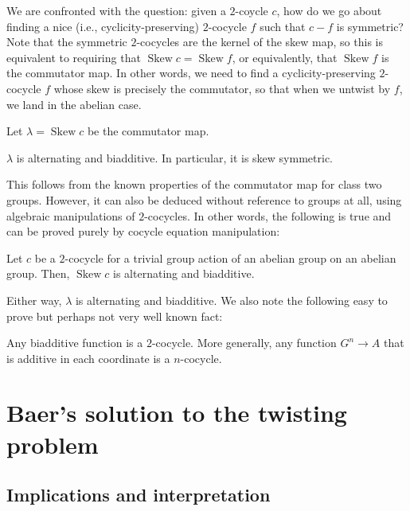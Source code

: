 \documentclass[10pt]{amsart}
\newcommand{\Skew}{\operatorname{Skew}}
\begin{document}
We are confronted with the question: given a $2$-coycle $c$, how do we
go about finding a nice (i.e., cyclicity-preserving) $2$-cocycle $f$
such that $c - f$ is symmetric? Note that the symmetric $2$-cocycles
are the kernel of the skew map, so this is equivalent to requiring
that $\Skew c = \Skew f$, or equivalently, that $\Skew f$ is the
commutator map. In other words, we need to find a cyclicity-preserving
$2$-cocycle $f$ whose skew is precisely the commutator, so that when
we untwist by $f$, we land in the abelian case.

Let $\lambda = \Skew c$ be the commutator map.

\begin{lemma}
  $\lambda$ is alternating and biadditive. In particular, it is skew
  symmetric.  
\end{lemma}

This follows from the known properties of the commutator map for class
two groups. However, it can also be deduced without reference to
groups at all, using algebraic manipulations of $2$-cocycles. In other
words, the following is true and can be proved purely by cocycle
equation manipulation:

\begin{lemma}
  Let $c$ be a $2$-cocycle for a trivial group action of an abelian
  group on an abelian group. Then, $\Skew c$ is alternating and
  biadditive.
\end{lemma}

Either way, $\lambda$ is alternating and biadditive. We also note the
following easy to prove but perhaps not very well known fact:

\begin{lemma}
  Any biadditive function is a $2$-cocycle. More generally, any
  function $G^n \to A$ that is additive in each coordinate is a
  $n$-cocycle.
\end{lemma}

\section{Baer's solution to the twisting problem}


\subsection{Implications and interpretation}
\end{document}
